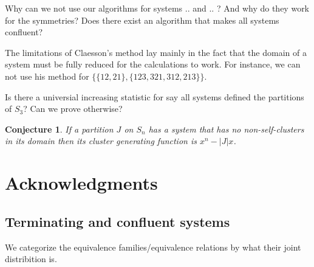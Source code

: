 \documentclass[openany, a4paper, 11pt, english]{article}
\newtheorem{conjecture}[theorem]{Conjecture}
\theoremstyle{definition}
\newcommand{\Sym}{S}
\begin{document}
Why can we not use our algorithms for systems .. and .. ? And why do they work
for the symmetries? Does there exist an algorithm that makes all systems confluent?

The limitations of Claesson's method lay mainly in the fact that the domain of a
system must be fully reduced for the calculations to work. For instance, we can not use his
method for $\{ \{ 12, 21 \}, \{ 123, 321, 312, 213 \} \}$.

Is there a universial increasing statistic for say all systems defined the
partitions of $\Sym_3$? Can we prove otherwise?

\begin{conjecture}
    If a partition $J$ on $\Sym_n$ has a system that has no non-self-clusters in
    its domain then its cluster generating function is $x^n-|J|x$.
\end{conjecture}

\section*{Acknowledgments}




\begin{appendices}
\section{Terminating and confluent systems}
We categorize the equivalence families/equivalence relations by what their joint
distribition is.
\begin{multicols}{2}

\end{multicols}
\end{appendices}
\end{document}
